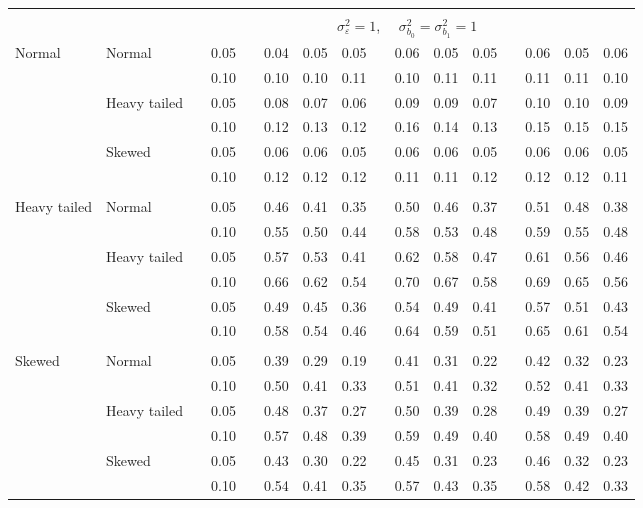 \documentclass{article} %
\begin{document}
\begin{table}[ht]
\begin{scriptsize}
\begin{center}
\begin{tabular}{ll p{.1cm} c p{.1cm} rrr p{.1cm} rrr p{.1cm} rrr}
&&&&&&&&&&&&&&&\\
& && && \multicolumn{9}{c}{$\sigma_{\varepsilon}^2 = 1$, \ \ $\sigma_{b_0}^2 = \sigma_{b_1}^2 = 1$} \\ \cline{6-16}
\rowcolor{gray!20}Normal       & Normal       && 0.05 &&   0.04 & 0.05 & 0.05 && 0.06 & 0.05 & 0.05 &&  0.06 & 0.05 & 0.06 \\
\rowcolor{gray!20}             &              && 0.10 &&   0.10 & 0.10 & 0.11 && 0.10 & 0.11 & 0.11 &&  0.11 & 0.11 & 0.10 \\
\rowcolor{gray!20}             & Heavy tailed && 0.05 &&   0.08 & 0.07 & 0.06 && 0.09 & 0.09 & 0.07 &&  0.10 & 0.10 & 0.09 \\
\rowcolor{gray!20}             &              && 0.10 &&   0.12 & 0.13 & 0.12 && 0.16 & 0.14 & 0.13 &&  0.15 & 0.15 & 0.15 \\
\rowcolor{gray!20}             & Skewed       && 0.05 &&   0.06 & 0.06 & 0.05 && 0.06 & 0.06 & 0.05 &&  0.06 & 0.06 & 0.05 \\
\rowcolor{gray!20}             &              && 0.10 &&   0.12 & 0.12 & 0.12 && 0.11 & 0.11 & 0.12 &&  0.12 & 0.12 & 0.11 \\
             &&&&&&&&&&&&&&&\\
Heavy tailed & Normal       && 0.05 &&   0.46 & 0.41 & 0.35 && 0.50 & 0.46 & 0.37 &&  0.51 & 0.48 & 0.38 \\
             &              && 0.10 &&   0.55 & 0.50 & 0.44 && 0.58 & 0.53 & 0.48 &&  0.59 & 0.55 & 0.48 \\
             & Heavy tailed && 0.05 &&   0.57 & 0.53 & 0.41 && 0.62 & 0.58 & 0.47 &&  0.61 & 0.56 & 0.46 \\
             &              && 0.10 &&   0.66 & 0.62 & 0.54 && 0.70 & 0.67 & 0.58 &&  0.69 & 0.65 & 0.56 \\
             & Skewed       && 0.05 &&   0.49 & 0.45 & 0.36 && 0.54 & 0.49 & 0.41 &&  0.57 & 0.51 & 0.43 \\
             &              && 0.10 &&   0.58 & 0.54 & 0.46 && 0.64 & 0.59 & 0.51 &&  0.65 & 0.61 & 0.54 \\
             &&&&&&&&&&&&&&&\\ 
Skewed       & Normal       && 0.05 &&   0.39 & 0.29 & 0.19 && 0.41 & 0.31 & 0.22 &&  0.42 & 0.32 & 0.23 \\
             &              && 0.10 &&   0.50 & 0.41 & 0.33 && 0.51 & 0.41 & 0.32 &&  0.52 & 0.41 & 0.33 \\
             & Heavy tailed && 0.05 &&   0.48 & 0.37 & 0.27 && 0.50 & 0.39 & 0.28 &&  0.49 & 0.39 & 0.27 \\
             &              && 0.10 &&   0.57 & 0.48 & 0.39 && 0.59 & 0.49 & 0.40 &&  0.58 & 0.49 & 0.40 \\
             & Skewed       && 0.05 &&   0.43 & 0.30 & 0.22 && 0.45 & 0.31 & 0.23 &&  0.46 & 0.32 & 0.23 \\
             &              && 0.10 &&   0.54 & 0.41 & 0.35 && 0.57 & 0.43 & 0.35 &&  0.58 & 0.42 & 0.33 \\



\end{tabular}
\end{center}
\end{scriptsize}
\end{table}
\end{document}

